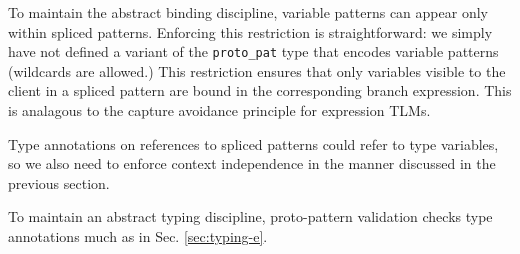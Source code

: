\documentclass[acmsmall,review,anonymous]{acmart}\settopmatter{printfolios=true,printccs=false,printacmref=false}
\newcommand{\li}[1]{\lstinline[basicstyle=\ttfamily\fontsize{9pt}{1em}\selectfont]{#1}}
\begin{document}



To maintain the abstract binding discipline, variable patterns can appear only within spliced patterns. Enforcing this restriction is straightforward: we simply have not defined a variant of the \li{proto_pat} type that encodes variable patterns (wildcards are allowed.)  This restriction ensures that only variables visible to the client in a spliced pattern are bound in the corresponding branch expression. This is analagous to the capture avoidance principle for expression TLMs.

Type annotations on references to spliced patterns could refer to type variables, so we also need to enforce context independence in the manner discussed in the previous section. %

To maintain an abstract typing discipline, proto-pattern validation checks type annotations much as in Sec. \ref{sec:typing-e}.%
\end{document}
